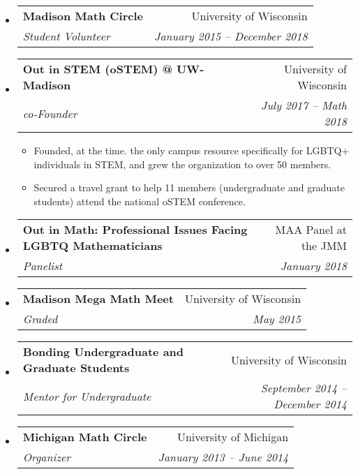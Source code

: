 \documentclass[letterpaper,11pt]{article}
\makeatletter
\newcommand{\resitem}[1]{\item #1 \vspace{-2pt}}
\newcommand{\ressubheading}[4]{
\begin{tabular*}{6.5in}[t]{l@{\cftdotfill{\cftsecdotsep}\extracolsep{\fill}}r}
		\textbf{#1} & #2 \\
		\textit{#3} & \textit{#4} \\
\end{tabular*}\vspace{-6pt}}
\makeatother
\begin{document}
\begin{itemize}
\item 
	\ressubheading{Madison Math Circle}{University of Wisconsin}{Student Volunteer}{January 2015 -- December 2018}
	
\item 
	\ressubheading{Out in STEM (oSTEM) @ UW-Madison}{University of Wisconsin}{co-Founder}{July 2017 -- Math 2018}
	\begin{itemize}
		\resitem{Founded, at the time. the only campus resource specifically for LGBTQ+ individuals in STEM, and grew the organization to over 50 members.}
		\resitem{Secured a travel grant to help 11 members (undergraduate and graduate students) attend the national oSTEM conference.}
		\end{itemize}

\item 
	\ressubheading{Out in Math: Professional Issues Facing LGBTQ Mathematicians}{MAA Panel at the JMM}{Panelist}{January 2018}
	
\item 
	\ressubheading{Madison Mega Math Meet}{University of Wisconsin}{Graded}{May 2015}
	
\item 
	\ressubheading{Bonding Undergraduate and Graduate Students}{University of Wisconsin}{Mentor for Undergraduate}{September 2014 -- December 2014}

\item 
	\ressubheading{Michigan Math Circle}{University of Michigan}{Organizer}{January 2013 -- June 2014}
	

\end{itemize}
\end{document}
